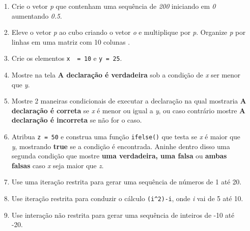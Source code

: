 \documentclass[
]{book}
\providecommand{\tightlist}{%
  \setlength{\itemsep}{0pt}\setlength{\parskip}{0pt}}
\begin{document}
\begin{enumerate}
\def\labelenumi{\arabic{enumi}.}
\tightlist
\item
  Crie o vetor \emph{p} que contenham uma sequência de \emph{200} iniciando em \emph{0} aumentando \emph{0.5}.
\item
  Eleve o vetor \emph{p} ao cubo criando o vetor \emph{o} e multiplique por \emph{p}.
  Organize \emph{p} por linhas em uma matriz com 10 colunas .\\
\item
  Crie os elementos \texttt{x\ \ =\ 10} e \texttt{y\ =\ 25}.
\item
  Mostre na tela \textbf{A declaração é verdadeira} sob a condição de \emph{x} ser menor que \emph{y}.
\item
  Mostre 2 maneiras condicionais de executar a declaração na qual mostraria \textbf{A declaração é correta} se \emph{x} é menor ou igual a \emph{y}, ou caso contrário mostre \textbf{A declaração é incorreta} se não for o caso.
\item
  Atribua \texttt{z\ =\ 50} e construa uma função \texttt{ifelse()} que testa se \emph{x} é maior que \emph{y}, mostrando \textbf{true} se a condição é encontrada. Aninhe dentro disso uma segunda condição que mostre \textbf{uma verdadeira, uma falsa} ou \textbf{ambas falsas} caso \emph{x} seja maior que \emph{z}.
\item
  Use uma iteração restrita para gerar uma sequência de números de 1 até 20.
\item
  Use iteração restrita para conduzir o cálculo \texttt{(i\^{}2)-i}, onde \emph{i} vai de 5 até 10.
\item
  Use interação não restrita para gerar uma sequência de inteiros de -10 até -20.
\end{enumerate}

  
\end{document}
